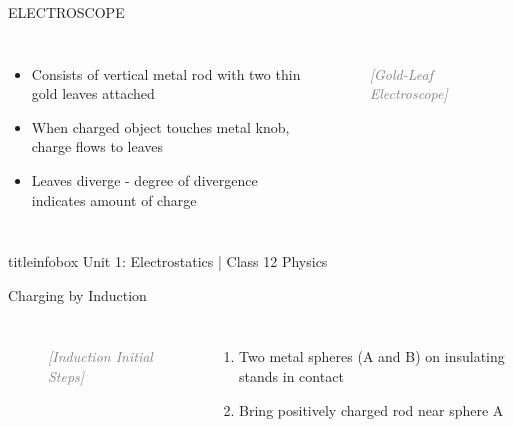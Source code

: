 \begin{frame}
\begin{frame}{ELECTROSCOPE}
\begin{columns}
\begin{itemize}
            \item Consists of vertical metal rod with two thin gold leaves attached
            
            \item When charged object touches metal knob, charge flows to leaves
            
            \item Leaves diverge - degree of divergence indicates amount of charge
        \end{itemize}
        
        \begin{figure}[h]
            \centering
            \textcolor{gray}{\textit{[Gold-Leaf Electroscope]}}
        \end{figure}
    \end{columns}
    
    \vfill
    
    \begin{beamercolorbox}[wd=\textwidth,ht=0.5cm,dp=0.1cm,center]{titleinfobox}
        \small\color{coolgray} Unit 1: Electrostatics | Class 12 Physics
    \end{beamercolorbox}
\end{frame}


\begin{frame}{Charging by Induction}
    \begin{columns}
        \begin{figure}[h]
            \centering
            \textcolor{gray}{\textit{[Induction Initial Steps]}}
        \end{figure}
        
        \begin{enumerate}
            \item[I.] Two metal spheres (A and B) on insulating stands in contact
            
            \item[II.] Bring positively charged rod near sphere A
            

\end{enumerate}
\end{columns}
\end{frame}
\end{frame}
